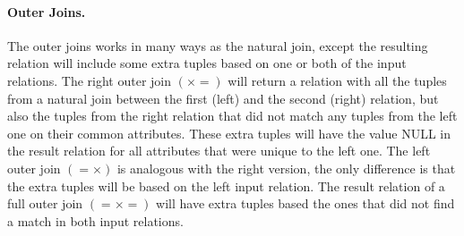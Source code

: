 \paragraph{Outer Joins.}
The outer joins works in many ways as the natural join, except the resulting relation will include some extra
tuples based on one or both of the input relations. The right outer join $(\times=)$ will return a relation with
all the tuples from a natural join between the first (left) and the second (right) relation, but also the tuples
from the right relation that did not match any tuples from the left one on their common attributes. These extra
tuples will have the value NULL in the result relation for all attributes that were unique to the left one. The
left outer join $(=\times)$ is analogous with the right version, the only difference is that the extra tuples will
be based on the left input relation. The result relation of a full outer join $(=\times=)$ will have extra tuples
based the ones that did not find a match in both input relations.
